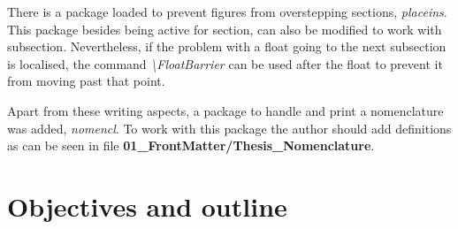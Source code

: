 There is a package loaded to prevent figures from overstepping sections, \emph{placeins}.
This package besides being active for section, can also be modified to work with subsection.
Nevertheless, if the problem with a float going to the next subsection is localised, the command \emph{\textbackslash{}FloatBarrier} can be used after the float to prevent it from moving past that point.

Apart from these writing aspects, a package to handle and print a nomenclature was added, \emph{nomencl}.
To work with this package the author should add definitions as can be seen in file \textbf{01\_FrontMatter/Thesis\_Nomenclature}.









\section{Objectives and outline}
\label{sec:Intro_OutlineObjectives}



